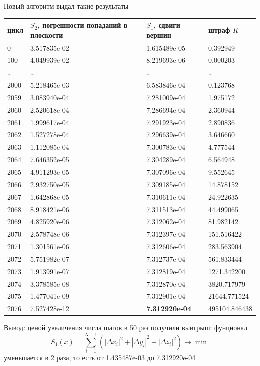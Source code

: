 \documentclass[a4paper,12pt, titlepage]{article}
\begin{document}
\begin{flushleft}
 Новый алгоритм выдал такие результаты
\end{flushleft}

\begin{flushleft}
 \begin{tabular}{|p{1cm}|p{5cm}|p{4cm}|p{3cm}|}
\hline
цикл & $S_{2}$, погрешности попаданий в плоскости & $S_{1}$, сдвиги вершин& штраф $K$ \\
  \hline
 0 & 3.517835e-02 & 1.615489e-05 & 0.392949\\
\hline
 100 & 4.049939e-02 & 8.219693e-06 & 0.000203\\
\hline
 \dots & \dots & \dots & \dots\\
\hline
 2000 & 5.218465e-03 & 6.583846e-04 & 0.123768\\
\hline
 2059 & 3.083940e-04 & 7.281009e-04 & 1.975172\\
\hline
 2060 & 2.520618e-04 & 7.286694e-04 & 2.360944\\
\hline
 2061 & 1.999617e-04 & 7.291923e-04 & 2.890836\\
\hline
 2062 & 1.527278e-04 & 7.296639e-04 & 3.646660\\
\hline
 2063 & 1.112085e-04 & 7.300783e-04 & 4.777544\\
\hline
 2064 & 7.646352e-05 & 7.304289e-04 & 6.564948\\
\hline
 2065 & 4.911293e-05 & 7.307096e-04 & 9.552645\\
\hline
 2066 & 2.932750e-05 & 7.309185e-04 & 14.878152\\
\hline
 2067 & 1.642868e-05 & 7.310611e-04 & 24.922635\\
\hline
 2068 & 8.918421e-06 & 7.311513e-04 & 44.499065\\
\hline
 2069 & 4.825920e-06 & 7.312062e-04 & 81.982142\\
\hline
 2070 & 2.578748e-06 & 7.312397e-04 & 151.516422\\
\hline
 2071 & 1.301561e-06 & 7.312606e-04 & 283.563904\\
\hline
 2072 & 5.751982e-07 & 7.312737e-04 & 561.833444\\
\hline
 2073 & 1.913991e-07 & 7.312819e-04 & 1271.342200\\
\hline
 2074 & 3.378585e-08 & 7.312870e-04 & 3820.717979\\
\hline
 2075 & 1.477041e-09 & 7.312901e-04 & 21644.771524\\
\hline
 2076 & 7.527428e-12 & \textbf{7.312920e-04} & 495104.846438\\
\hline
 \end{tabular}
\end{flushleft}
\begin{flushleft}
 Вывод: ценой увеличения числа шагов в 50 раз получили выигрыш: фунционал
$$	
	S_{1}(x) = \sum\limits_{i = 1}^{N - 1}(|\Delta x_{i}|^{2} + |\Delta y_{i}|^{2} + |\Delta z_{i}|^{2})\to \min		
$$
уменьшается в 2 раза, то есть от 1.435487e-03 до 7.312920e-04
\end{flushleft}
\end{document}
